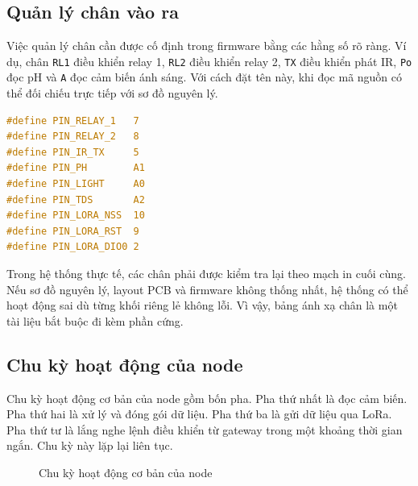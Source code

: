 \subsection{Quản lý chân vào ra}
Việc quản lý chân cần được cố định trong firmware bằng các hằng số rõ ràng. Ví dụ, chân \texttt{RL1} điều khiển relay 1, \texttt{RL2} điều khiển relay 2, \texttt{TX} điều khiển phát IR, \texttt{Po} đọc pH và \texttt{A} đọc cảm biến ánh sáng. Với cách đặt tên này, khi đọc mã nguồn có thể đối chiếu trực tiếp với sơ đồ nguyên lý.

\begin{lstlisting}[language=C,caption={Ví dụ định nghĩa chân trên node Arduino}]
#define PIN_RELAY_1   7
#define PIN_RELAY_2   8
#define PIN_IR_TX     5
#define PIN_PH        A1
#define PIN_LIGHT     A0
#define PIN_TDS       A2
#define PIN_LORA_NSS  10
#define PIN_LORA_RST  9
#define PIN_LORA_DIO0 2
\end{lstlisting}

Trong hệ thống thực tế, các chân phải được kiểm tra lại theo mạch in cuối cùng. Nếu sơ đồ nguyên lý, layout PCB và firmware không thống nhất, hệ thống có thể hoạt động sai dù từng khối riêng lẻ không lỗi. Vì vậy, bảng ánh xạ chân là một tài liệu bắt buộc đi kèm phần cứng.

\subsection{Chu kỳ hoạt động của node}
Chu kỳ hoạt động cơ bản của node gồm bốn pha. Pha thứ nhất là đọc cảm biến. Pha thứ hai là xử lý và đóng gói dữ liệu. Pha thứ ba là gửi dữ liệu qua LoRa. Pha thứ tư là lắng nghe lệnh điều khiển từ gateway trong một khoảng thời gian ngắn. Chu kỳ này lặp lại liên tục.

\begin{figure}[h!]
    \centering
    \caption{Chu kỳ hoạt động cơ bản của node}
    \label{fig:node_cycle}
\end{figure}

